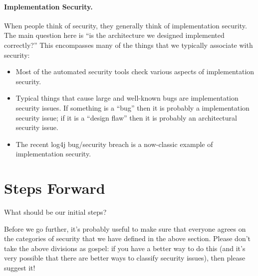 \paragraph{Implementation Security.}  When people think of security, they generally think of implementation security.  The main question here is ``is the architecture we designed implemented correctly?''  This encompasses many of the things that we typically associate with security:
\begin{itemize}
\item Most of the automated security tools check various aspects of implementation security.
\item Typical things that cause large and well-known bugs are implementation security issues.  If something is a ``bug'' then it is probably a implementation security issue; if it is a ``design flaw'' then it is probably an architectural security issue.
\item The recent log4j bug/security breach is a now-classic example of implementation security.
\end{itemize}

\section{Steps Forward}
What should be our initial steps?  

\medskip

\noindent Before we go further, it's probably useful to make sure that everyone agrees on the categories of security that we have defined in the above section.  Please don't take the above divisions as gospel:  if you have a better way to do this (and it's very possible that there are better ways to classify security issues), then please suggest it!